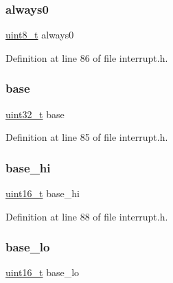 \subsubsection{\texorpdfstring{always0}{always0}}
{\footnotesize\ttfamily \hyperlink{a00140_aba7bc1797add20fe3efdf37ced1182c5_aba7bc1797add20fe3efdf37ced1182c5}{uint8\+\_\+t} always0}



Definition at line 86 of file interrupt.\+h.

\mbox{\label{a00110_a0523cedff47e2441fc198b7770ec5d3f_a0523cedff47e2441fc198b7770ec5d3f}} 
\subsubsection{\texorpdfstring{base}{base}}
{\footnotesize\ttfamily \hyperlink{a00140_a435d1572bf3f880d55459d9805097f62_a435d1572bf3f880d55459d9805097f62}{uint32\+\_\+t} base}



Definition at line 85 of file interrupt.\+h.

\mbox{\label{a00110_af85e6d5e4292b0c25c18f701e61d51fa_af85e6d5e4292b0c25c18f701e61d51fa}} 
\subsubsection{\texorpdfstring{base\+\_\+hi}{base\_hi}}
{\footnotesize\ttfamily \hyperlink{a00140_a273cf69d639a59973b6019625df33e30_a273cf69d639a59973b6019625df33e30}{uint16\+\_\+t} base\+\_\+hi}



Definition at line 88 of file interrupt.\+h.

\mbox{\label{a00110_a1a4688f97e405d4c0700427f4b74a355_a1a4688f97e405d4c0700427f4b74a355}} 
\subsubsection{\texorpdfstring{base\+\_\+lo}{base\_lo}}
{\footnotesize\ttfamily \hyperlink{a00140_a273cf69d639a59973b6019625df33e30_a273cf69d639a59973b6019625df33e30}{uint16\+\_\+t} base\+\_\+lo}



